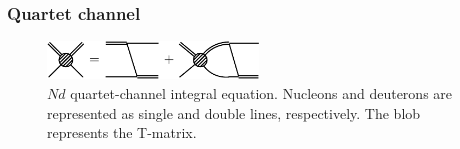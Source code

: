 \subsubsection{Quartet channel}
\label{sec:EFT-NdQuartet}

\begin{figure}[htbp]
\centering
\includegraphics[clip,width=0.5\textwidth]{nd-IntEq-Q}
\caption{$Nd$ quartet-channel integral equation.  Nucleons and deuterons are 
represented as single and double lines, respectively.  The blob represents the 
T-matrix.}
\label{fig:nd-IntEq-Q}
\end{figure}

